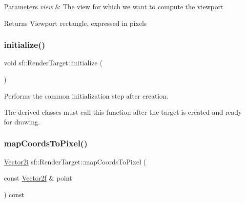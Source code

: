 \begin{DoxyParams}{Parameters}
{\em view} & The view for which we want to compute the viewport\\
\hline
\end{DoxyParams}
\begin{DoxyReturn}{Returns}
Viewport rectangle, expressed in pixels 
\end{DoxyReturn}
\mbox{\label{classsf_1_1_render_target_af530274b34159d644e509b4b4dc43eb7}} 
\subsubsection{\texorpdfstring{initialize()}{initialize()}}
{\footnotesize\ttfamily void sf\+::\+Render\+Target\+::initialize (\begin{DoxyParamCaption}{ }\end{DoxyParamCaption})\hspace{0.3cm}{\ttfamily [protected]}}



Performs the common initialization step after creation. 

The derived classes must call this function after the target is created and ready for drawing. \mbox{\label{classsf_1_1_render_target_ad92a9f0283aa5f3f67e473c1105b68cf}} 
\subsubsection{\texorpdfstring{map\+Coords\+To\+Pixel()}{mapCoordsToPixel()}\hspace{0.1cm}{\footnotesize\ttfamily [1/2]}}
{\footnotesize\ttfamily \hyperlink{classsf_1_1_vector2}{Vector2i} sf\+::\+Render\+Target\+::map\+Coords\+To\+Pixel (\begin{DoxyParamCaption}\item[{const \hyperlink{classsf_1_1_vector2}{Vector2f} \&}]{point }\end{DoxyParamCaption}) const}



